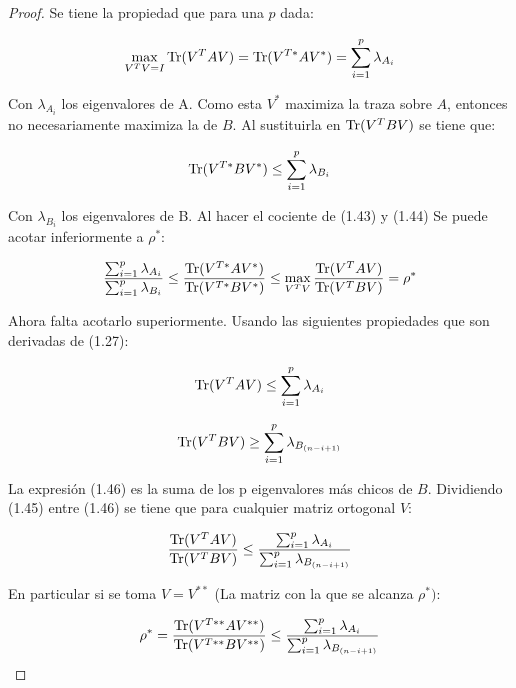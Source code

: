 \begin{proof}
Se tiene la propiedad que para una $p$ dada:


\begin{equation}\label{eq:2.44}
\max_{V^T V = I} \operatorname{Tr}(V^T A V) =  \operatorname{Tr}(V^{T*} A V^*) = \sum_{i=1}^p \lambda_{A_i }
\end{equation}
 
Con $\lambda_{A_i}$ los eigenvalores de A. Como esta $V^*$ maximiza la traza sobre $A$, entonces no necesariamente maximiza la de $B$. Al sustituirla en $\operatorname{Tr}(V^{T} B V)$ se tiene que: 

\begin{equation}\label{eq:2.45}
\operatorname{Tr}(V^{T*} B V^*) \leq \sum_{i=1}^p \lambda_{B_i }
\end{equation}

Con $\lambda_{B_i}$ los eigenvalores de B. Al hacer el cociente de (1.43) y (1.44) Se puede acotar inferiormente a $\rho^*$:


\begin{equation*}
  \frac{\sum_{i=1}^p \lambda_{A_i}} {\sum_{i=1}^p \lambda_{B_i}} \leq \frac{\operatorname{Tr}(V^{T*} A V^*)}{\operatorname{Tr}(V^{T*} B V^*)} \leq \max_{V^T V} \frac{\operatorname{Tr}(V^{T} A V)}{\operatorname{Tr}(V^{T} B V)} = \rho^*
\end{equation*}

Ahora falta acotarlo superiormente. Usando las siguientes propiedades que son derivadas de (1.27):

\begin{equation}\label{eq:2.46}
  \operatorname{Tr}(V^T A V) \leq \sum_{i=1}^p \lambda_{A_i} 
\end{equation}

\begin{equation}\label{eq:2.47}
  \operatorname{Tr}(V^T B V) \geq \sum_{i=1}^p \lambda_{B_{(n-i+1)}}
\end{equation}

La expresión (1.46) es la suma de los p eigenvalores más chicos de $B$. Dividiendo (1.45) entre (1.46) se tiene que para cualquier matriz ortogonal $V$:

\begin{equation}\label{eq:2.48}
   \frac{\operatorname{Tr}(V^{T} A V)}{\operatorname{Tr}(V^{T} B V)} \leq \frac{\sum_{i=1}^p \lambda_{A_i}}{\sum_{i=1}^p \lambda_{B_{(n-i+1)}}}
\end{equation}

En particular si se toma $V = V^{**}$ (La matriz con la que se alcanza $\rho^*)$:

\begin{equation}\label{eq:2.49}
  \rho^* = \frac{\operatorname{Tr}(V^{T**} A V^{**})}{\operatorname{Tr}(V^{T**} B V^{**})} \leq \frac{\sum_{i=1}^p \lambda_{A_i}}{\sum_{i=1}^p \lambda_{B_{(n-i+1)}}}
\end{equation}

\end{proof}
